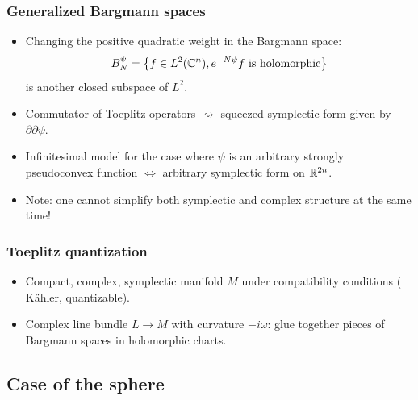 \documentclass[mathserif]{beamer}
\begin{document}
\begin{frame}\frametitle{Generalized Bargmann spaces}
  \begin{itemize}
    \item Changing the positive quadratic weight in the Bargmann space:
  \[
    B_N^{\psi}=\left\{f\in L^2(\mathbb{C}^n), e^{-N\psi}f \text{ is
        holomorphic}\right\}
  \]
  is another closed subspace of $L^2$.

  \item<2-> Commutator of Toeplitz operators $\rightsquigarrow$
    squeezed symplectic form given by
    $\partial\overline{\partial}\psi$.
    
  \item<3-> Infinitesimal model for the case where $\psi$ is an
    arbitrary strongly pseudoconvex function $\Leftrightarrow$ arbitrary
    symplectic form on $\mathbb{R}^{2n}$.
      \item<4> Note: one cannot simplify both symplectic and complex
          structure at the same time!
      \end{itemize}
    \end{frame}
    
\begin{frame}
  \frametitle{Toeplitz quantization}
  \begin{itemize}
  \item Compact, complex, symplectic manifold $M$
    under compatibility conditions ({\color{myorange} K\"ahler, quantizable}).
    \item<2-> Complex line bundle $L\to M$ with curvature
  $-i\omega$: glue together pieces of Bargmann spaces in holomorphic charts.
\end{itemize}

\vfill

\end{frame}


\subsection{Case of the sphere}
\end{document}
